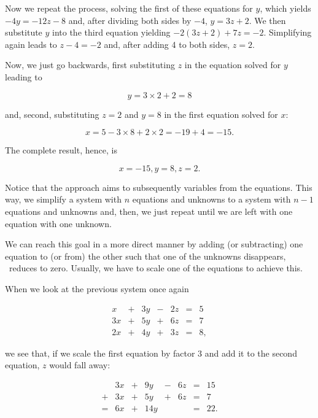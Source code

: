 \documentclass[tikz]{scrreprt}
\begin{document}
Now we repeat the process, solving the first of these equations
for $y$, which yields $-4y = -12z-8$ and, after dividing
both sides by $-4$, $y=3z+2$. We then substitute $y$
into the third equation yielding $-2(3z+2) + 7z = -2$.
Simplifying again leads to $z-4=-2$ and, after adding 4 to both sides,
$z=2$.

Now, we just go backwards, first 
substituting $z$ in the equation solved for $y$ leading to

\begin{equation}
y=3\times 2 + 2 = 8
\end{equation}

and, second, substituting $z=2$ and $y=8$ in the first equation
solved for $x$:

\begin{equation}
x = 5 - 3\times 8 + 2\times 2 = -19 + 4 = -15.
\end{equation}

The complete result, hence, is 

\[
x=-15, y=8, z=2.
\]

Notice that the approach aims to subsequently 
 variables from the equations.
This way, we simplify a system with $n$ equations 
and unknowns to a system with $n-1$ equations and unknowns
and, then, we just repeat until we are left with
one equation with one unknown.

We can reach this goal in a more direct manner
by adding (or subtracting) one equation to (or from)
the other such that one of the unknowns disappears,
\ie\ reduces to zero. Usually, we have to scale
one of the equations to achieve this.

When we look at the previous system once again

\begin{equation}
\begin{array}{rcrcrcr}
 x & + & 3y & - & 2z & = &  5\\
3x & + & 5y & + & 6z & = &  7\\
2x & + & 4y & + & 3z & = &  8,
\end{array}
\end{equation}

we see that, if we scale the first equation by factor 3
and add it to the second equation, $z$ would fall away:

\begin{equation}\label{eq:linPen1}
\begin{array}{crcrcrcr}
  & 3x & +  & 9y  & - & 6z & = & 15\\
+ & 3x & +  & 5y  & + & 6z & = &  7\\
= & 6x & + & 14y  &   &  & = & 22.
\end{array}
\end{equation}
\end{document}

